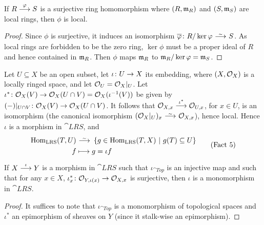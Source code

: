 \documentclass[a4paper,parskip=half,numbers=enddot, DIV=12]{scrreprt}
\begin{document}
\begin{fact}
    If $R\morphism[\phi]S$ is a surjective ring homomorphism where $(R,\mathfrak{m}_R)$ and $(S,\mathfrak{m}_S)$ are local rings, then $\phi$ is local.
\end{fact}
\begin{proof}
	Since $\phi$ is surjective, it induces an isomorphism $\ov{\phi}\colon R/\ker\phi\isomorphism S$. As local rings are forbidden to be the zero ring, $\ker\phi$ must be a proper ideal of $R$ and hence contained in $\mathfrak{m}_R$. Then $\phi$ maps $\mathfrak{m}_R$ to $\mathfrak{m}_R/\ker\varphi=\mathfrak{m}_S$.
\end{proof}
\begin{example}
    Let $U\subseteq X$ be an open subset, let $\iota\colon U\morphism X$ its embedding, where $(X,\mathcal{O}_X)$ is a locally ringed space, and let $\mathcal{O}_U = \mathcal{O}_X|_U$. Let $\iota^*\colon \Oo_X(V)\morphism \Oo_X(U\cap V) = \Oo_X(\iota^{-1}(V))$ be given by $(-)|_{U\cap V}\colon \Oo_X(V) \morphism \Oo_X(U\cap V)$. It follows that $\Oo_{X,x}\morphism[\iota^*]\Oo_{U,x}$, for $x\in U$, is an isomorphism (the canonical isomorphism $(\Oo_X|_U)_x \isomorphism \Oo_{X,x}$), hence local. Hence $\iota$ is a morphism in $\cat{LRS}$, and
    \begin{align}\lbl{eq:fact5}
	    \begin{split}
		    \Hom_{\cat{LRS}}(T,U)  &\isomorphism\left\{g\in \Hom_{\cat{LRS}} (T,X) \st g(T)\subseteq U\right\}\\
		    f&\longmapsto g=\iota f
	    \end{split}\tag{Fact 5}
    \end{align}
\end{example}
\begin{fact}
    If $X\morphism[\iota] Y$ is a morphism in $\cat{LRS}$ such that $\iota_{\cat{Top}}$ is an injective map and such that for any $x\in X$, $\iota_x^*\colon \Oo_{Y,\iota(x)} \morphism \Oo_{X,x}$ is surjective, then $\iota$ is a monomorphism in $\cat{LRS}$.
\end{fact}
\begin{proof}
	It suffices to note that $\iota_{\cat{Top}}$ is a monomorphism of topological spaces and $\iota^*$ an epimorphism of sheaves on $Y$ (since it stalk-wise an epimorphism).
\end{proof}
\end{document}
